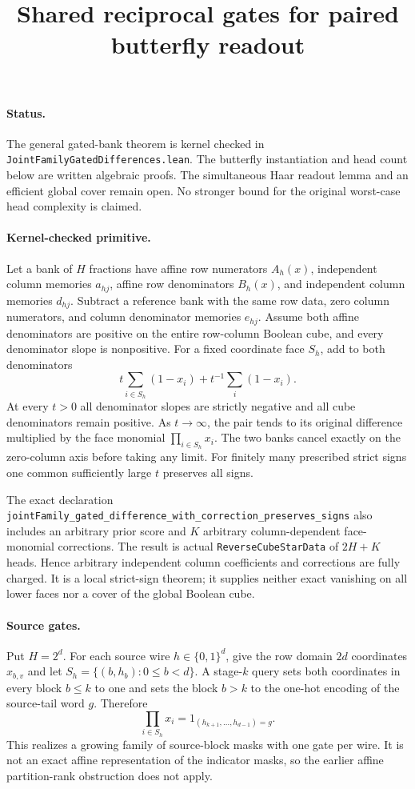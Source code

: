 \documentclass{article}
\begin{document}
\title{Shared reciprocal gates for paired butterfly readout}
\maketitle

\paragraph{Status.}
The general gated-bank theorem is kernel checked in
\texttt{JointFamilyGatedDifferences.lean}.  The butterfly instantiation and
head count below are written algebraic proofs.  The simultaneous Haar
readout lemma and an efficient global cover remain open.  No stronger
bound for the original worst-case head complexity is claimed.

\paragraph{Kernel-checked primitive.}
Let a bank of $H$ fractions have affine row numerators $A_h(x)$,
independent column memories $a_{hj}$, affine row denominators $B_h(x)$,
and independent column memories $d_{hj}$.  Subtract a reference bank
with the same row data, zero column numerators, and column denominator
memories $e_{hj}$.  Assume both affine denominators are positive on the
entire row-column Boolean cube, and every denominator slope is
nonpositive.  For a fixed coordinate face $S_h$, add to both denominators
\[
 t\sum_{i\in S_h}(1-x_i)+t^{-1}\sum_i(1-x_i).
\]
At every $t>0$ all denominator slopes are strictly negative and all
cube denominators remain positive.  As $t\to\infty$, the pair tends to
its original difference multiplied by the face monomial
$\prod_{i\in S_h}x_i$.  The two banks cancel exactly on the zero-column
axis before taking any limit.  For finitely many prescribed strict
signs one common sufficiently large $t$ preserves all signs.

The exact declaration
\texttt{jointFamily\_gated\_difference\_with\_correction\_preserves\_signs}
also includes an arbitrary prior score and $K$ arbitrary column-dependent
face-monomial corrections.  The result is actual
\texttt{ReverseCubeStarData} of $2H+K$ heads.  Hence arbitrary independent
column coefficients and corrections are fully charged.  It is a local
strict-sign theorem; it supplies neither exact vanishing on all lower
faces nor a cover of the global Boolean cube.

\paragraph{Source gates.}
Put $H=2^d$.  For each source wire $h\in\{0,1\}^d$, give the row domain
$2d$ coordinates $x_{b,v}$ and let
$S_h=\{(b,h_b):0\leq b<d\}$.  A stage-$k$ query sets both coordinates
in every block $b\leq k$ to one and sets the block $b>k$ to the one-hot
encoding of the source-tail word $g$.  Therefore
\[
 \prod_{i\in S_h}x_i=1_{(h_{k+1},\ldots,h_{d-1})=g}.
\]
This realizes a growing family of source-block masks with one gate per
wire.  It is not an exact affine representation of the indicator masks,
so the earlier affine partition-rank obstruction does not apply.
\end{document}
